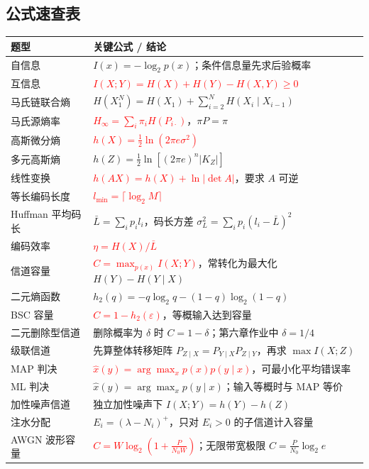 \subsection{公式速查表}

{\scriptsize
\noindent\begin{tabularx}{\textwidth}{@{}l>{\raggedright\arraybackslash}X@{}}
\toprule
\textbf{题型} & \textbf{关键公式 / 结论} \\
\midrule
自信息 & $I(x)=-\log_2p(x)$；条件信息量先求后验概率 \\
\midrule
互信息 & \textcolor{Red}{$I(X;Y)=H(X)+H(Y)-H(X,Y)\ge0$} \\
\midrule
马氏链联合熵 & $H(X_1^N)=H(X_1)+\sum_{i=2}^{N}H(X_i\mid X_{i-1})$ \\
\midrule
马氏源熵率 & \textcolor{Red}{$H_\infty=\sum_i\pi_iH(P_{i\cdot})$}，$\pi P=\pi$ \\
\midrule
高斯微分熵 & \textcolor{Red}{$h(X)=\frac12\ln(2\pi e\sigma^2)$} \\
\midrule
多元高斯熵 & $h(Z)=\frac12\ln[(2\pi e)^n|K_Z|]$ \\
\midrule
线性变换 & \textcolor{Red}{$h(AX)=h(X)+\ln|\det A|$}，要求 $A$ 可逆 \\
\midrule
等长编码长度 & \textcolor{Red}{$l_{\min}=\lceil\log_2M\rceil$} \\
\midrule
Huffman 平均码长 & $\bar L=\sum_i p_il_i$，码长方差 $\sigma_L^2=\sum_i p_i(l_i-\bar L)^2$ \\
\midrule
编码效率 & \textcolor{Red}{$\eta=H(X)/\bar L$} \\
\midrule
信道容量 & \textcolor{Red}{$C=\max_{p(x)}I(X;Y)$}，常转化为最大化 $H(Y)-H(Y\mid X)$ \\
\midrule
二元熵函数 & $h_2(q)=-q\log_2q-(1-q)\log_2(1-q)$ \\
\midrule
BSC 容量 & \textcolor{Red}{$C=1-h_2(\varepsilon)$}，等概输入达到容量 \\
\midrule
二元删除型信道 & 删除概率为 $\delta$ 时 $C=1-\delta$；第六章作业中 $\delta=1/4$ \\
\midrule
级联信道 & 先算整体转移矩阵 $P_{Z\mid X}=P_{Y\mid X}P_{Z\mid Y}$，再求 $\max I(X;Z)$ \\
\midrule
MAP 判决 & \textcolor{Red}{$\hat x(y)=\arg\max_x p(x)p(y\mid x)$}，可最小化平均错误率 \\
\midrule
ML 判决 & $\hat x(y)=\arg\max_x p(y\mid x)$；输入等概时与 MAP 等价 \\
\midrule
加性噪声信道 & 独立加性噪声下 $I(X;Y)=h(Y)-h(Z)$ \\
\midrule
注水分配 & $E_i=(\lambda-N_i)^+$，只对 $E_i>0$ 的子信道计入容量 \\
\midrule
AWGN 波形容量 & \textcolor{Red}{$C=W\log_2\left(1+\frac{P}{N_0W}\right)$}；无限带宽极限 $C=\frac{P}{N_0}\log_2e$ \\
\bottomrule
\end{tabularx}
}
